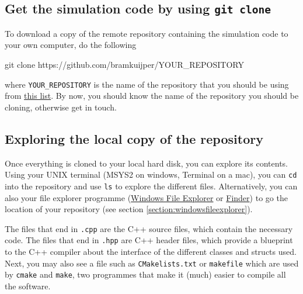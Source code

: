 \documentclass[
]{book}
\newenvironment{Shaded}{\begin{snugshade}}{\end{snugshade}}
\newcommand{\FunctionTok}[1]{\textcolor[rgb]{0.00,0.00,0.00}{#1}}
\newcommand{\NormalTok}[1]{#1}
\begin{document}
\hypertarget{get-the-simulation-code-by-using-git-clone}{%
\subsection{\texorpdfstring{Get the simulation code by using \texttt{git\ clone}}{Get the simulation code by using git clone}}\label{get-the-simulation-code-by-using-git-clone}}

To download a copy of the remote repository containing the simulation code to your own computer, do the following

\begin{Shaded}
\begin{Highlighting}[]
\FunctionTok{git}\NormalTok{ clone https://github.com/bramkuijper/YOUR\_REPOSITORY}
\end{Highlighting}
\end{Shaded}

where \texttt{YOUR\_REPOSITORY} is the name of the repository that you should be using from \href{https://github.com/bramkuijper?tab=repositories}{this list}. By now, you should know the name of the repository you should be cloning, otherwise get in touch.

\hypertarget{exploring-the-local-copy-of-the-repository}{%
\subsection{Exploring the local copy of the repository}\label{exploring-the-local-copy-of-the-repository}}

Once everything is cloned to your local hard disk, you can explore its contents. Using your UNIX terminal (MSYS2 on windows, Terminal on a mac), you can \texttt{cd} into the repository and use \texttt{ls} to explore the different files. Alternatively, you can also your file explorer programme (\href{https://support.microsoft.com/en-us/windows/find-and-open-file-explorer-ef370130-1cca-9dc5-e0df-2f7416fe1cb1\#WindowsVersion=Windows_10}{Windows File Explorer} or \href{https://support.apple.com/en-gb/HT201732}{Finder}) to go the location of your repository (see section \ref{section:windowsfileexplorer}).

The files that end in \texttt{.cpp} are the C++ source files, which contain the necessary
code. The files that end in \texttt{.hpp}
are C++ header files, which provide a blueprint to the C++ compiler about
the interface of the different classes and structs used. Next, you may also
see a file such as \texttt{CMakelists.txt} or \texttt{makefile} which are used by \texttt{cmake}
and \texttt{make}, two programmes that make it (much) easier to compile all the software.
\end{document}
